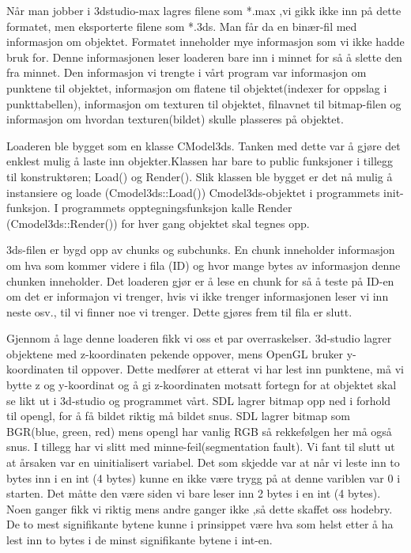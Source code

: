 \documentclass[11pt, dvips]{report}
\begin{document}
Når man jobber i 3dstudio-max lagres filene som *.max ,vi gikk ikke
inn på dette formatet, men eksporterte filene som *.3ds. Man får da en
binær-fil med informasjon om objektet. Formatet inneholder mye
informasjon som vi ikke hadde bruk for. Denne informasjonen leser
loaderen bare inn i minnet for så å slette den fra minnet. Den
informasjon vi trengte i vårt program var informasjon om punktene til
objektet, informasjon om flatene til objektet(indexer for oppslag i
punkttabellen), informasjon om texturen til objektet, filnavnet til
bitmap-filen og informasjon om hvordan texturen(bildet) skulle
plasseres på objektet.

Loaderen ble bygget som en klasse CModel3ds. Tanken med dette var å
gjøre det enklest mulig å laste inn objekter.Klassen har bare to
public funksjoner i tillegg til konstruktøren; Load() og Render(). Slik
klassen ble bygget er det nå mulig å instansiere og loade
(Cmodel3ds::Load()) Cmodel3ds-objektet i programmets init-funksjon. I 
programmets opptegningsfunksjon kalle Render (Cmodel3ds::Render())
for hver gang objektet skal tegnes opp.

3ds-filen er bygd opp av chunks og subchunks. En chunk inneholder
informasjon om hva som kommer videre i fila (ID) og hvor mange bytes
av informasjon denne chunken inneholder. Det loaderen gjør er å lese en
chunk for så å teste på ID-en om det er informajon vi trenger, hvis vi
ikke trenger informasjonen leser vi inn neste osv., til vi finner noe
vi trenger. Dette gjøres frem til fila er slutt.

Gjennom å lage denne loaderen fikk vi oss et par overraskelser.
3d-studio lagrer objektene med z-koordinaten pekende oppover, mens
OpenGL bruker y-koordinaten til oppover. Dette medfører at etterat vi
har lest inn punktene, må vi bytte z og y-koordinat og å gi z-koordinaten
motsatt fortegn for at objektet skal se likt ut i 3d-studio og
programmet vårt.  SDL lagrer bitmap opp ned i forhold til opengl, for
å få bildet riktig må bildet snus. SDL lagrer bitmap som BGR(blue,
green, red) mens opengl har vanlig RGB så rekkefølgen her må også
snus.  I tillegg har vi slitt med minne-feil(segmentation fault). Vi
fant til slutt ut at årsaken var en uinitialisert variabel. Det som
skjedde var at når vi leste inn to bytes inn i en int (4 bytes) kunne
en ikke være trygg på at denne variblen var 0 i starten. Det måtte den
være siden vi bare leser inn 2 bytes i en int (4 bytes). Noen ganger
fikk vi riktig mens andre ganger ikke ,så dette skaffet oss hodebry. De
to mest signifikante bytene kunne i prinsippet være hva som helst
etter å ha lest inn to bytes i de minst signifikante bytene i int-en.
\end{document}
